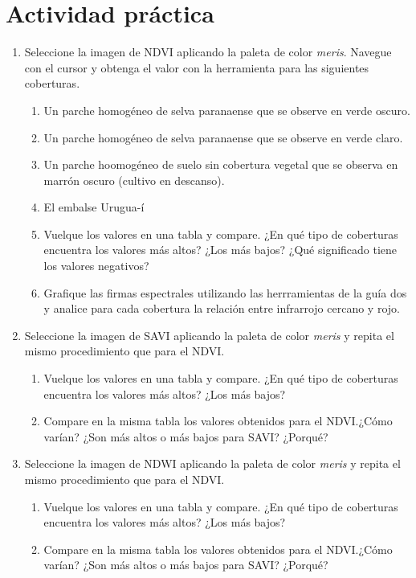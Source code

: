 \section{Actividad práctica}
\begin{enumerate}
  \item Seleccione la imagen de NDVI aplicando la paleta de color \emph{meris}. Navegue con el cursor y obtenga el valor con la herramienta  para las siguientes coberturas.
  \begin{enumerate}

    \item Un parche homogéneo de selva paranaense que se observe en verde oscuro.
    \item Un parche homogéneo de selva paranaense que se observe en verde claro.
    \item Un parche hoomogéneo de suelo sin cobertura vegetal que se observa en marrón oscuro (cultivo en descanso).
    \item El embalse Urugua-í
    \item Vuelque los valores en una tabla y compare. ¿En qué tipo de coberturas encuentra los valores más altos? ¿Los más bajos? ¿Qué significado tiene los valores negativos?
    \item Grafique las firmas espectrales utilizando las herrramientas de la guía dos y analice para cada cobertura la relación entre infrarrojo cercano y rojo.
  \end{enumerate}


  \item Seleccione la imagen de SAVI aplicando la paleta de color \emph{meris} y repita el mismo procedimiento que para el NDVI.
  \begin{enumerate}
   \item Vuelque los valores en una tabla y compare. ¿En qué tipo de coberturas encuentra los valores más altos? ¿Los más bajos?
   \item Compare en la misma tabla los valores obtenidos para el NDVI.¿Cómo varían? ¿Son más altos o más bajos para SAVI? ¿Porqué?
 \end{enumerate}

\item Seleccione la imagen de NDWI aplicando la paleta de color \emph{meris} y repita el mismo procedimiento que para el NDVI.
  \begin{enumerate}
   \item Vuelque los valores en una tabla y compare. ¿En qué tipo de coberturas encuentra los valores más altos? ¿Los más bajos?
   \item Compare en la misma tabla los valores obtenidos para el NDVI.¿Cómo varían? ¿Son más altos o más bajos para SAVI? ¿Porqué?
  \end{enumerate}
\end{enumerate}

